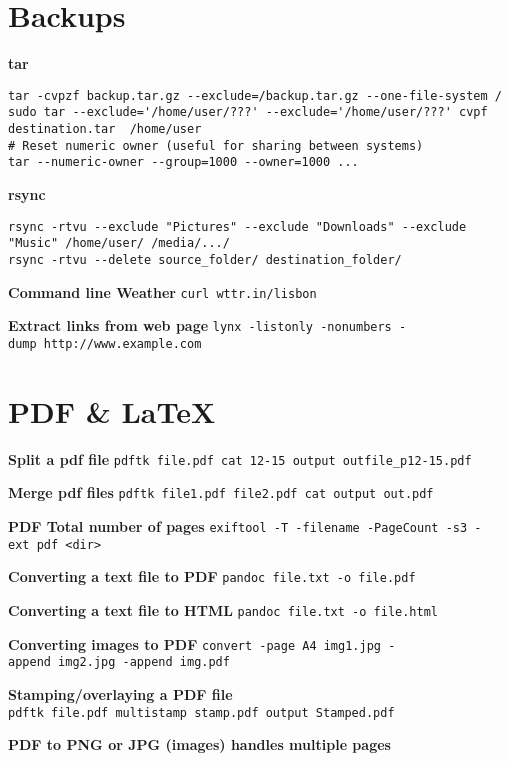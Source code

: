 \documentclass[]{book}
\theoremstyle{definition}
\theoremstyle{definition}
\theoremstyle{definition}
\theoremstyle{remark}
\begin{document}
\section{Backups}\label{backups}

\textbf{tar}

\begin{verbatim}
tar -cvpzf backup.tar.gz --exclude=/backup.tar.gz --one-file-system / 
sudo tar --exclude='/home/user/???' --exclude='/home/user/???' cvpf destination.tar  /home/user
# Reset numeric owner (useful for sharing between systems)
tar --numeric-owner --group=1000 --owner=1000 ... 
\end{verbatim}

\textbf{rsync}

\begin{verbatim}
rsync -rtvu --exclude "Pictures" --exclude "Downloads" --exclude "Music" /home/user/ /media/.../
rsync -rtvu --delete source_folder/ destination_folder/
\end{verbatim}

\textbf{Command line Weather} \texttt{curl\ wttr.in/lisbon}

\textbf{Extract links from web page}
\texttt{lynx\ -listonly\ -nonumbers\ -dump\ http://www.example.com}

\section{PDF \& LaTeX}\label{pdf-latex}

\textbf{Split a pdf file}
\texttt{pdftk\ file.pdf\ cat\ 12-15\ output\ outfile\_p12-15.pdf}

\textbf{Merge pdf files}
\texttt{pdftk\ file1.pdf\ file2.pdf\ cat\ output\ out.pdf}

\textbf{PDF Total number of pages}
\texttt{exiftool\ -T\ -filename\ -PageCount\ -s3\ -ext\ pdf\ \textless{}dir\textgreater{}}

\textbf{Converting a text file to PDF}
\texttt{pandoc\ file.txt\ -o\ file.pdf}

\textbf{Converting a text file to HTML}
\texttt{pandoc\ file.txt\ -o\ file.html}

\textbf{Converting images to PDF}
\texttt{convert\ -page\ A4\ img1.jpg\ -append\ img2.jpg\ -append\ img.pdf}

\textbf{Stamping/overlaying a PDF file}
\texttt{pdftk\ file.pdf\ multistamp\ stamp.pdf\ output\ Stamped.pdf}

\textbf{PDF to PNG or JPG (images) handles multiple pages}
\end{document}
